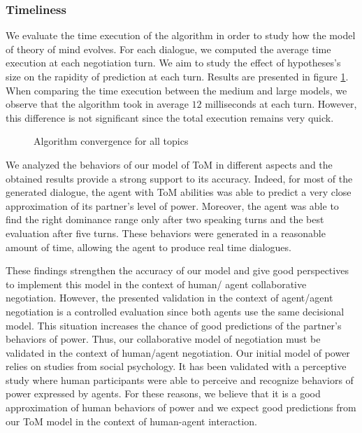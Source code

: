 \documentclass[conference, letterpaper]{IEEEtran}
\begin{document}
	
	\subsubsection{Timeliness}
	We evaluate the time execution of the algorithm in order to study how the model of theory of mind evolves. For each dialogue, we computed the average time execution at each negotiation turn. We aim to study the effect of hypotheses's size on the rapidity of prediction at each turn. Results are presented in figure \ref{fig:time}. When comparing the time execution between the medium and large models, we observe that the algorithm took in average $12$ milliseconds at each turn. However, this difference is not significant since the total execution remains very quick.
	
	\begin{figure}[]
		\caption{Algorithm convergence for all topics} 
		\label{fig:time}
	\end{figure}
	
	We analyzed the behaviors of our model of ToM in different aspects and the obtained results provide a strong support to its accuracy. Indeed, for most of the generated dialogue, the agent with ToM abilities was able to predict a very close approximation of its partner's level of power. Moreover, the agent was able to find the right dominance range only after two speaking turns and the best evaluation after five turns. These behaviors were generated in a reasonable amount of time, allowing the agent to produce real time dialogues.
	
	These findings strengthen the accuracy of our model and give good perspectives to implement this model in the context of human/ agent collaborative negotiation. However, the presented validation in the context of agent/agent negotiation is a controlled evaluation since both agents use the same decisional model. This situation increases the chance of good predictions of the partner's behaviors of power. 	
	Thus, our collaborative model of negotiation must be validated in the context of human/agent negotiation. Our initial model of power \cite{ouali2017computational} relies on studies from social psychology. It has been validated with a perceptive study where human participants were able to perceive and recognize behaviors of power expressed by agents. For these reasons, we believe that it is a good approximation of human behaviors of power and we expect good predictions from our ToM model in the context of human-agent interaction.
\end{document}
